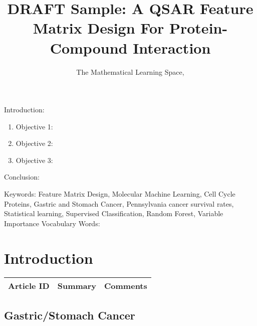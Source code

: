 
\twocolumn
\scriptsize
\begin{frontmatter}
		\title{DRAFT Sample: A QSAR Feature Matrix Design For Protein-Compound Interaction}
		\author{The Mathematical Learning Space, }
		\address{The Mathematical Learning Space}
\end{frontmatter}	

Introduction:
\begin{enumerate}
\item Objective 1:
\item Objective 2:
\item Objective 3:
\end{enumerate}
Conclusion:

Keywords: Feature Matrix Design, Molecular Machine Learning, Cell Cycle Proteins, Gastric and Stomach Cancer, Pennsylvania cancer survival rates, Statistical learning, Supervised Classification, Random Forest, Variable Importance 
Vocabulary Words:

\section{Introduction}

\begin{table}[H]\centering
	\begin{tabular}{p{1cm}p{4cm}p{3cm}}
		Article ID & Summary & Comments\\
		\hline
		\hline
	\end{tabular}
\end{table}


\subsection{Gastric/Stomach Cancer}

